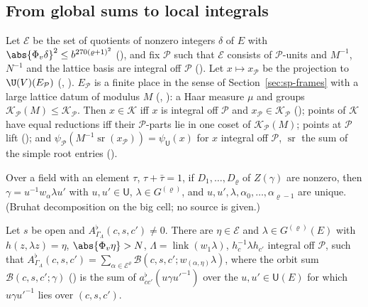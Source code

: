 \subsection{From global sums to local integrals}\label{sp-main:ss:local}

Let $\mathcal E$ be the set of quotients of nonzero integers $\delta$ of $E$ with
$\abs{\Phi_v\delta}^2\le b^{270(\varrho+1)^2}$ (), and fix $\mathcal P$ such
that $\mathcal E$ consists of $\mathcal P$-units and $M^{-1}$, $N^{-1}$ and the lattice basis are integral
off $\mathcal P$ (). Let $x\mapsto x_{\mathcal P}$ be the projection
to $\U(V)(E_{\mathcal P})$ (,
). $E_{\mathcal P}$ is a finite place in the sense of
Section~\ref{sec:sp-frames} with a large lattice datum of modulus $M$
(, ): a Haar measure $\mu$ and
groups $\mathcal K_{\mathcal P}(M)\le\mathcal K_{\mathcal P}$. Then $x\in\mathcal K$ iff $x$ is integral off $\mathcal P$
and $x_{\mathcal P}\in\mathcal K_{\mathcal P}$ (); points of $\mathcal K$
have equal reductions iff their $\mathcal P$-parts lie in one coset of $\mathcal K_{\mathcal P}(M)$; points at
$\mathcal P$ lift (); and $\psi_{\mathcal P}(M^{-1}\operatorname{sr}(x_{\mathcal P}))
=\psi_{\mathsf U}(x)$ for $x$ integral off $\mathcal P$, $\operatorname{sr}$ the sum of the simple root entries
().

\begin{fact}\label{sp-main:fact:cell}
Over a field with an element $\tau$, $\tau+\bar\tau=1$, if $D_1,\dots,D_\varrho$ of $Z(\gamma)$ are nonzero,
then $\gamma=u^{-1}w_\alpha\lambda u'$ with $u,u'\in\mathsf U$, $\lambda\in G^{(\varrho)}$, and
$u,u',\lambda,\alpha_0,\dots,\alpha_{\varrho-1}$ are unique. (Bruhat decomposition on the big cell; no source is given.)
\end{fact}

\begin{lemma}
\label{sp-main:lem:cell}
Let $s$ be open and $A^\flat_{\Gamma_\Lambda}(c,s,c')\ne0$. There are $\eta\in\mathcal E$ and $\lambda\in
G^{(\varrho)}(E)$ with $h(z,\lambda z)=\eta$, $\abs{\Phi_v\eta}>N$, $\Lambda=\operatorname{link}(w_1\lambda)$,
$h_c^{-1}\lambda h_{c'}$ integral off $\mathcal P$, such that $A^\flat_{\Gamma_\Lambda}(c,s,c')=\sum_{\alpha\in
\mathcal E^\varrho}\mathcal B(c,s,c';w_{(\alpha,\eta)}\lambda)$, where the orbit sum
$\mathcal B(c,s,c';\gamma)$ () is the sum of $a^\flat_{cc'}(u\gamma u'^{-1})$
over the $u,u'\in\mathsf U(E)$ for which $u\gamma u'^{-1}$ lies over $(c,s,c')$.
\end{lemma}

